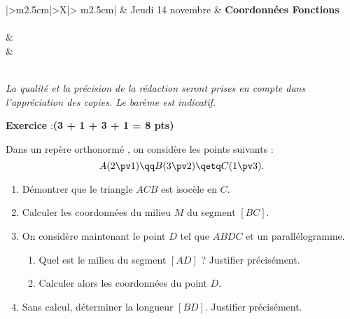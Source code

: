 \documentclass[10pt,french]{book}
\newcounter{exoc}
\newenvironment{exoc}[1]{%
  \refstepcounter{exoc}\textbf{Exercice \theexoc} :\hfill {\textbf{(#1)}}\par
  \medskip}%
{\medskip}
\begin{document}
\begin{center}
\begin{tabularx}{\textwidth}{|>\centering m{2.5cm}|>\centering X|>{\centering\arraybackslash} m{2.5cm}|}
	\hline
		 &  Jeudi 14 novembre  & \textbf{Coordonnées Fonctions} \\
	\hline
		 \\
	\hline
         &  \\
		 &  \\
	\hline
         \\[1cm]
    \hline
\end{tabularx}\bigskip

{\itshape
La qualité et la précision de la rédaction seront prises en compte dans l'appréciation des copies.
Le barème est indicatif.}
\end{center}

\begin{exoc}{3 + 1 + 3 + 1 = 8 pts}
    Dans un repère orthonormé \OIJ, on considère les points suivants :
    \[A(2\pv 1) \qq B(3 \pv 2) \qetq C(1 \pv 3).\]
    \begin{enumerate}
        \item Démontrer que le triangle $ACB$ est isocèle en $C$.
        \item Calculer les coordonnées du milieu $M$ du segment $[BC]$.
        \item On considère maintenant le point $D$ tel que $ABDC$ et un parallélogramme.
            \begin{enumerate}
                \item Quel est le milieu du segment $[AD]$ ? Justifier précisément.
                \item Calculer alors les coordonnées du point $D$.
            \end{enumerate}
        \item Sans calcul, déterminer la longueur $[BD]$. Justifier précisément.
    \end{enumerate}
\end{exoc}
\end{document}
